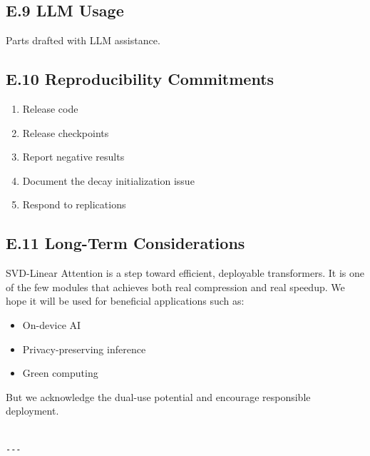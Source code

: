 \subsection{E.9 LLM Usage}

Parts drafted with LLM assistance.

\subsection{E.10 Reproducibility Commitments}

\begin{enumerate}
\item Release code
\item Release checkpoints
\item Report negative results
\item Document the decay initialization issue
\item Respond to replications

\end{enumerate}
\subsection{E.11 Long-Term Considerations}

SVD-Linear Attention is a step toward efficient, deployable transformers. 
It is one of the few modules that achieves both real compression and real 
speedup. We hope it will be used for beneficial applications such as:

\begin{itemize}
\item On-device AI
\item Privacy-preserving inference
\item Green computing

\end{itemize}
But we acknowledge the dual-use potential and encourage responsible 
deployment.
\begin{lstlisting}

---
\end{lstlisting}